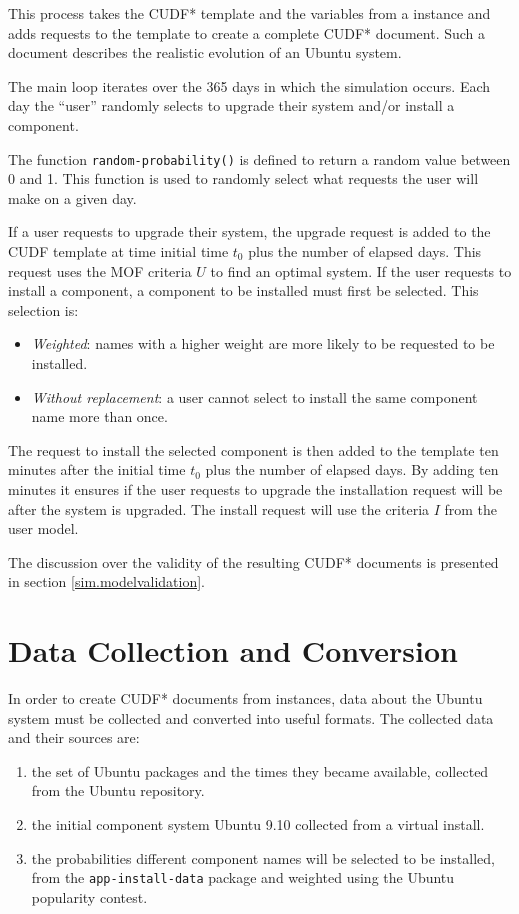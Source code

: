 This process takes the CUDF* template and the variables from a \usermodel instance and adds requests to the template to  create a complete CUDF* document.
Such a document describes the realistic evolution of an Ubuntu system.

The main loop iterates over the 365 days in which the simulation occurs.
Each day the ``user'' randomly selects to upgrade their system and/or install a component.

The function \texttt{random-probability()} is defined to return a random value between 0 and 1.
This function is used to randomly select what requests the user will make on a given day.

If a user requests to upgrade their system, the upgrade request is added to the CUDF template at time initial time $t_0$ plus the number of elapsed days.
This request uses the MOF criteria $U$ to find an optimal system.
If the user requests to install a component, a component to be installed must first be selected.
This selection is: 
\begin{itemize}
  \item \textit{Weighted}: names with a higher weight are more likely to be requested to be installed.
  \item \textit{Without replacement}: a user cannot select to install the same component name more than once.
\end{itemize} 
The request to install the selected component is then added to the template ten minutes after the initial time $t_0$ plus the number of elapsed days.
By adding ten minutes it ensures if the user requests to upgrade the installation request will be after the system is upgraded.
The install request will use the criteria $I$ from the user model.

The discussion over the validity of the resulting CUDF* documents is presented in section \ref{sim.modelvalidation}.

\section{\usermodel Data Collection and Conversion}
\label{sim.collection}
In order to create CUDF* documents from \usermodel instances, data about the Ubuntu system must be collected and converted into useful formats.
The collected data and their sources are:
\begin{enumerate}
  \item the set of Ubuntu packages and the times they became available, collected from the Ubuntu repository.
  \item the initial component system Ubuntu 9.10 collected from a virtual install.
  \item the probabilities different component names will be selected to be installed, from the \texttt{app-install-data} package and weighted using the Ubuntu popularity contest.
\end{enumerate}


